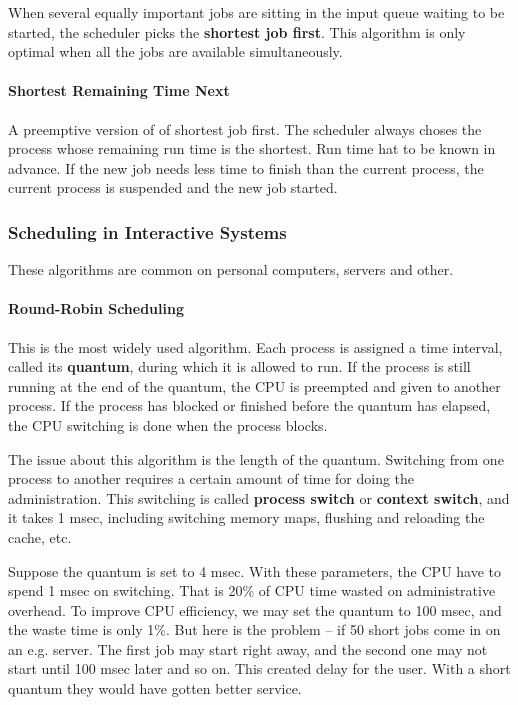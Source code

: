 \documentclass[11pt,a4paper]{article}
\begin{document}
When several equally important jobs are sitting in the input queue waiting to be started, the scheduler picks the \textbf{shortest job first}. This algorithm is only optimal when all the jobs are available simultaneously.

\paragraph{Shortest Remaining Time Next}
A preemptive version of of shortest job first.  The scheduler always choses the process whose remaining run time is the shortest. Run time hat to be known in advance. If the new job needs less time to finish than the current process, the current process is suspended and the new job started. 

\subsubsection{Scheduling in Interactive Systems}
These algorithms are common on personal computers, servers and other.

\paragraph{Round-Robin Scheduling}
This is the most widely used algorithm. Each process is assigned a time interval, called its \textbf{quantum}, during which it is allowed to run. If the process is still running at the end of the quantum, the CPU is preempted and given to another process. If the process has blocked or finished before the quantum has elapsed, the CPU switching is done when the process blocks.

The issue about this algorithm is the length of the quantum. Switching from one process to another requires a certain amount of time for doing the administration. This switching is called \textbf{process switch} or \textbf{context switch}, and it takes 1 msec, including switching memory maps, flushing and reloading the cache, etc. 

Suppose the quantum is set to 4 msec. With these parameters, the CPU have to spend 1 msec on switching. That is 20\% of CPU time wasted on administrative overhead. To improve CPU efficiency, we may set the quantum to 100 msec, and the waste time is only 1\%. But here is the problem -- if 50 short jobs come in on an e.g. server. The first job may start right away, and the second one may not start until 100 msec later and so on. This created delay for the user.  With a short quantum they would have gotten better service. 
\end{document}
